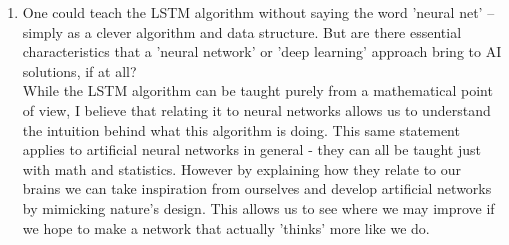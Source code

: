 \documentclass[notitlepage]{report}
\theoremstyle{plain} %
\theoremstyle{definition} %
\theoremstyle{plain} %
\begin{document}
\begin{enumerate}
\item One could teach the LSTM algorithm without saying the word 'neural net' \--- simply as a clever algorithm and data structure. But are there essential characteristics that a 'neural network' or 'deep learning' approach bring to AI solutions, if at all?
\medskip\\
	While the LSTM algorithm can be taught purely from a mathematical point of view, I believe that relating it to neural networks allows us to understand the intuition behind what this algorithm is doing. This same statement applies to artificial neural networks in general \-- they can all be taught just with math and statistics. However by explaining how they relate to our brains we can take inspiration from ourselves and develop artificial networks by mimicking nature's design. This allows us to see where we may improve if we hope to make a network that actually 'thinks' more like we do. 
\end{enumerate}
\end{document}
